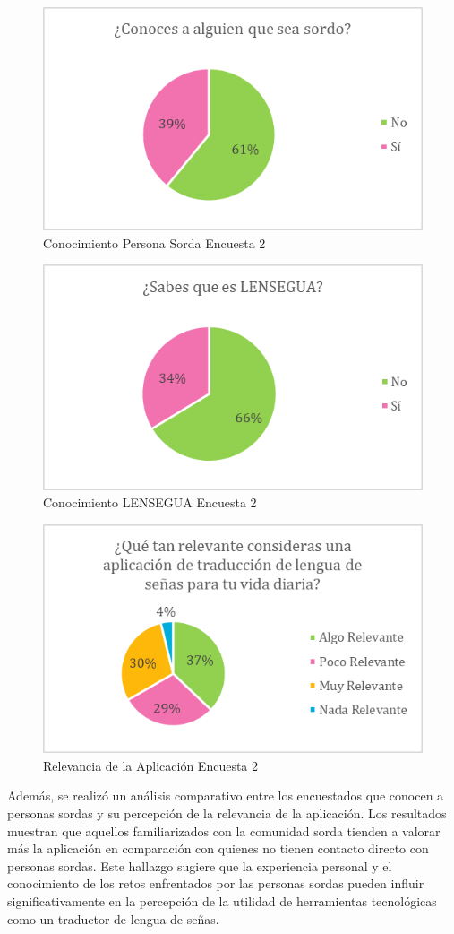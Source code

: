 \begin{figure} [H]
    \centering
    \includegraphics[width=0.5\linewidth]{figuras/conocimientoSordaEncuesta.png}
    \caption{Conocimiento Persona Sorda Encuesta 2}
    \label{fig:enter-label}
\end{figure}

\begin{figure} [H]
    \centering
    \includegraphics[width=0.5\linewidth]
    {figuras/conoimiento_lensegua.png}
    \caption{Conocimiento LENSEGUA Encuesta 2}

\end{figure}

\begin{figure} [H]
    \centering
    \includegraphics[width=0.5\linewidth]{figuras/relevancia_app.png}
    \caption{ Relevancia de la Aplicación Encuesta 2}
    \label{fig:enter-label}
\end{figure}


Además, se realizó un análisis comparativo entre los encuestados que conocen a personas sordas y su percepción de la relevancia de la aplicación. Los resultados muestran que aquellos familiarizados con la comunidad sorda tienden a valorar más la aplicación en comparación con quienes no tienen contacto directo con personas sordas. Este hallazgo sugiere que la experiencia personal y el conocimiento de los retos enfrentados por las personas sordas pueden influir significativamente en la percepción de la utilidad de herramientas tecnológicas como un traductor de lengua de señas.

